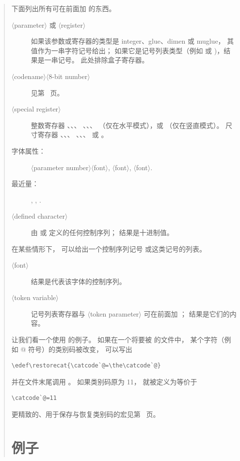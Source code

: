 \documentclass[a4paper]{rapport3}
\def\gr#1{$\langle$#1$\rangle$}\def\key#1{{\tt#1}}
\newenvironment{disp}{\begin{quotation}}{\end{quotation}}
\begin{document}
\begin{disp}
下面列出所有可在前面加  的东西。
\begin{description}\item [\gr{parameter} 或 \gr{register}]
如果该参数或寄存器的类型是 integer、glue、dimen 或 muglue，
其值作为一串字符记号给出；
如果它是记号列表类型（例如
 或 )，结果是一串记号。
此处排除盒子寄存器。
\item [\gr{codename}\gr{8-bit number}]
见第~\pageref{codename} 页。
\item [\gr{special register}]
整数寄存器 、、、
、、、
（仅在水平模式），或 （仅在竖直模式）。
尺寸寄存器 、、、
、、、
 或 。
\item [字体属性：]
\gr{parameter number}\gr{font}, 
\gr{font},
\gr{font}.
\item [最近量：]
, , .
\item [\gr{defined character}]
由  或  定义的任何控制序列；
结果是十进制值。
\end{description}
在某些情形下， 可以给出一个控制序列记号
或这类记号的列表。
\begin{description}\item [\gr{font}]
结果是代表该字体的控制序列。
\item [\gr{token variable}]
记号列表寄存器与 \gr{token parameter} 可在前面加 ；
结果是它们的内容。
\end{description}

让我们看一个使用  的例子。
如果在一个将要被  的文件中，
某个字符（例如 @ 符号）的类别码被改变，
可以写出
\begin{verbatim}
\edef\restorecat{\catcode`@=\the\catcode`@}
\end{verbatim}
并在文件末尾调用 。
如果类别码原为 11，
就被定义为等价于 \begin{verbatim}
\catcode`@=11
\end{verbatim}
更精致的、用于保存与恢复类别码的宏见第~\pageref{store:cat} 页。


\section{例子}


\end{disp}
\end{document}
